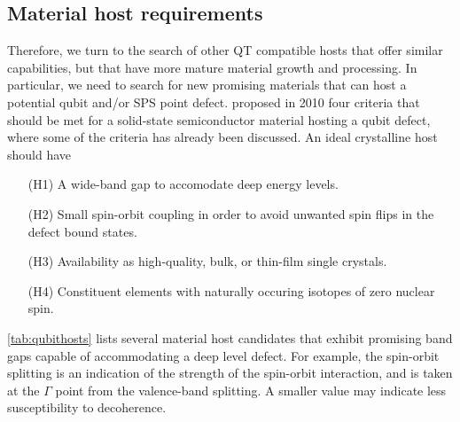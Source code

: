 \subsection{Material host requirements}
\label{ssec:qubit-material-host-requirements}
Therefore, we turn to the search of other QT compatible hosts that offer similar capabilities, but that have more mature material growth and processing. In particular, we need to search for new promising materials that can host a potential qubit and/or SPS point defect. \citeauthor{Weber2010} \cite{Weber2010} proposed in 2010 four criteria that should be met for a solid-state semiconductor material hosting a qubit defect, where some of the criteria has already been discussed. An ideal crystalline host should have \cite{Weber2010}
\begin{itemize}
  \item[(H1)] A wide-band gap to accomodate deep energy levels.
  \item[(H2)] Small spin-orbit coupling in order to avoid unwanted spin flips in the defect bound states.
  \item[(H3)] Availability as high-quality, bulk, or thin-film single crystals.
  \item[(H4)] Constituent elements with naturally occuring isotopes of zero nuclear spin.
\end{itemize}


\noindent \autoref{tab:qubithosts} lists several material host candidates that exhibit promising band gaps capable of accommodating a deep level defect. For example, the spin-orbit splitting is an indication of the strength of the spin-orbit interaction, and is taken at the $\Gamma$ point from the valence-band splitting. A smaller value may indicate less susceptibility to decoherence.

